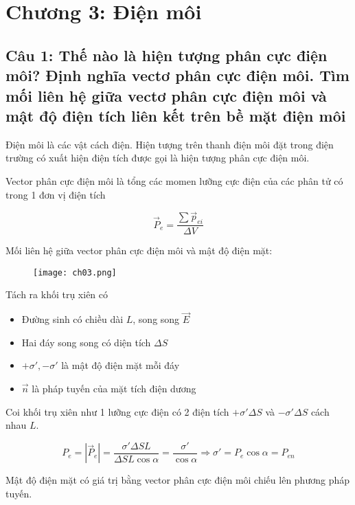 \section[Chương 3]{Chương 3: Điện môi}

\subsection[Câu 1]{Câu 1: Thế nào là hiện tượng phân cực điện môi? Định nghĩa vectơ phân cực điện môi. Tìm mối liên hệ giữa vectơ phân cực điện môi và mật độ điện tích liên kết trên bề mặt điện môi}

Điện môi là các vật cách điện. Hiện tượng trên thanh điện môi đặt trong điện trường có xuất hiện điện tích được gọi là hiện tượng phân cực điện môi.

Vector phân cực điện môi là tổng các momen lưỡng cực điện của các phân tử có trong 1 đơn vị điện tích

\begin{equation*}
  \vec{P}_e = \frac{\sum \vec{p}_{ei}}{\Delta V}
\end{equation*}

Mối liên hệ giữa vector phân cực điện môi và mật độ điện mặt:

\begin{figure}[h]
  \centering
  \texttt{[image: ch03.png]}
\end{figure}

Tách ra khối trụ xiên có

\begin{itemize}
  \item Đường sinh có chiều dài $L$, song song $\vec{E}$
  \item Hai đáy song song có diện tích $\Delta S$
  \item $+\sigma', -\sigma'$ là mật độ điện mặt mỗi đáy
  \item $\vec{n}$ là pháp tuyến của mặt tích điện dương
\end{itemize}

Coi khối trụ xiên như 1 lưỡng cực điện có 2 điện tích $+\sigma' \Delta S$ và $-\sigma' \Delta S$ cách nhau $L$.

\begin{equation*}
  P_e = \left| \vec{P}_e \right| = \frac{\sigma' \Delta S L}{\Delta S L \cos\alpha} = \frac{\sigma'}{\cos\alpha} 
  \Rightarrow \sigma' = P_e\cos\alpha = P_{en}
\end{equation*}

Mật độ điện mặt có giá trị bằng vector phân cực điện môi chiếu lên phương pháp tuyến.

